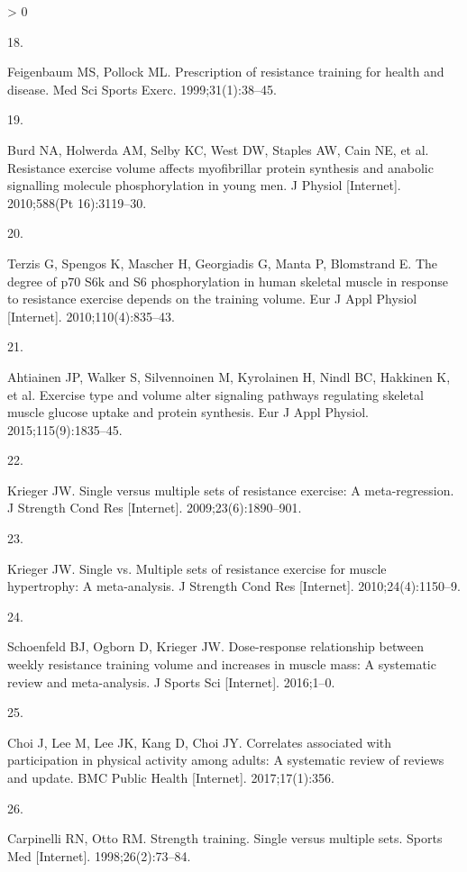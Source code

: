 \documentclass[twoside,10pt]{gihclass} %
\newlength{\cslhangindent}
\newlength{\csllabelwidth}
\newenvironment{CSLReferences}[3] %
 {%
  \setlength{\parindent}{0pt}
  \ifodd #1 \everypar{\setlength{\hangindent}{\cslhangindent}}\ignorespaces\fi
  \ifnum #2 > 0
  \setlength{\parskip}{#2\baselineskip}
  \fi
 }%
 {}
\newcommand{\CSLLeftMargin}[1]{\parbox[t]{\maxof{\widthof{#1}}{\csllabelwidth}}{#1}}
\newcommand{\CSLRightInline}[1]{\parbox[t]{\linewidth}{#1}}
\begin{document}
\begin{CSLReferences}{0}{0}
\leavevmode\hypertarget{ref-RN2538}{}%
\CSLLeftMargin{18. }
\CSLRightInline{Feigenbaum MS, Pollock ML. Prescription of resistance training for health and disease. Med Sci Sports Exerc. 1999;31(1):38--45. }

\leavevmode\hypertarget{ref-RN791}{}%
\CSLLeftMargin{19. }
\CSLRightInline{Burd NA, Holwerda AM, Selby KC, West DW, Staples AW, Cain NE, et al. Resistance exercise volume affects myofibrillar protein synthesis and anabolic signalling molecule phosphorylation in young men. J Physiol {[}Internet{]}. 2010;588(Pt 16):3119--30. }

\leavevmode\hypertarget{ref-RN784}{}%
\CSLLeftMargin{20. }
\CSLRightInline{Terzis G, Spengos K, Mascher H, Georgiadis G, Manta P, Blomstrand E. The degree of p70 S6k and S6 phosphorylation in human skeletal muscle in response to resistance exercise depends on the training volume. Eur J Appl Physiol {[}Internet{]}. 2010;110(4):835--43. }

\leavevmode\hypertarget{ref-RN1837}{}%
\CSLLeftMargin{21. }
\CSLRightInline{Ahtiainen JP, Walker S, Silvennoinen M, Kyrolainen H, Nindl BC, Hakkinen K, et al. Exercise type and volume alter signaling pathways regulating skeletal muscle glucose uptake and protein synthesis. Eur J Appl Physiol. 2015;115(9):1835--45. }

\leavevmode\hypertarget{ref-RN793}{}%
\CSLLeftMargin{22. }
\CSLRightInline{Krieger JW. Single versus multiple sets of resistance exercise: A meta-regression. J Strength Cond Res {[}Internet{]}. 2009;23(6):1890--901. }

\leavevmode\hypertarget{ref-RN789}{}%
\CSLLeftMargin{23. }
\CSLRightInline{Krieger JW. Single vs. Multiple sets of resistance exercise for muscle hypertrophy: A meta-analysis. J Strength Cond Res {[}Internet{]}. 2010;24(4):1150--9. }

\leavevmode\hypertarget{ref-RN1767}{}%
\CSLLeftMargin{24. }
\CSLRightInline{Schoenfeld BJ, Ogborn D, Krieger JW. Dose-response relationship between weekly resistance training volume and increases in muscle mass: A systematic review and meta-analysis. J Sports Sci {[}Internet{]}. 2016;1--0. }

\leavevmode\hypertarget{ref-RN2063}{}%
\CSLLeftMargin{25. }
\CSLRightInline{Choi J, Lee M, Lee JK, Kang D, Choi JY. Correlates associated with participation in physical activity among adults: A systematic review of reviews and update. BMC Public Health {[}Internet{]}. 2017;17(1):356. }

\leavevmode\hypertarget{ref-RN794}{}%
\CSLLeftMargin{26. }
\CSLRightInline{Carpinelli RN, Otto RM. Strength training. Single versus multiple sets. Sports Med {[}Internet{]}. 1998;26(2):73--84. }


\end{CSLReferences}
\end{document}
